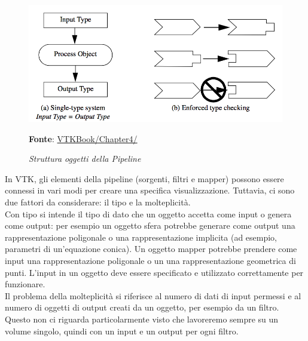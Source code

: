 \begin{figure}[h]
    \centering
    \includegraphics[scale=0.35]{immagini/volumerendering/pipeline.png}
    \caption{\textit{Struttura oggetti della Pipeline}}
    \textbf{Fonte}: \href{https://lorensen.github.io/VTKExamples/site/VTKBook/04Chapter4/}{VTKBook/Chapter4/}
    \label{fig: Struttura Pipeline}
\end{figure}

In VTK, gli elementi della pipeline (sorgenti, filtri e mapper) possono essere connessi in vari modi per creare una specifica visualizzazione. Tuttavia, ci sono due fattori da considerare: il tipo e la molteplicità.\\
Con tipo si intende il tipo di dato che un oggetto accetta come input o genera come output: per esempio un oggetto sfera potrebbe generare come output una rappresentazione poligonale o una rappresentazione implicita (ad esempio, parametri di un'equazione conica). Un oggetto mapper potrebbe prendere come input una rappresentazione poligonale o un una rappresentazione geometrica di punti. L'input in un oggetto deve essere specificato e utilizzato correttamente per funzionare.
\\
Il problema della molteplicità si riferisce al numero di dati di input permessi e al numero di oggetti di output creati da un oggetto, per esempio da un filtro. Questo non ci riguarda particolarmente visto che lavoreremo sempre su un volume singolo, quindi con un input e un output per ogni filtro.

